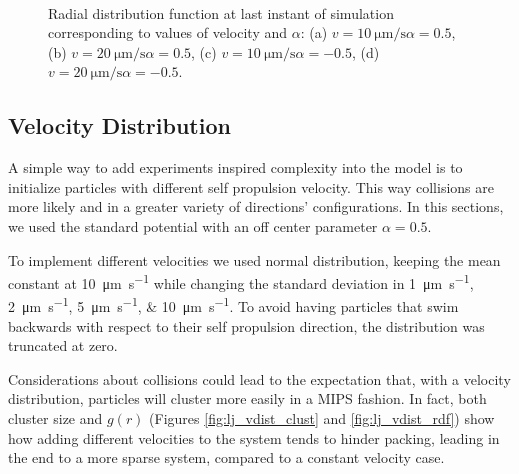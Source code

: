 \documentclass[../../master_thesis_np.tex]{subfiles}
\begin{document}
		\begin{figure}
			\centering
			\ContinuedFloat
			\\
			
			\caption{Radial distribution function at last instant of simulation corresponding to values of velocity and $\alpha$: (a) $v = \SI{10}{\um \per \second} \alpha = 0.5$, (b) $v = \SI{20}{\um \per \second} \alpha = 0.5$, (c) $v = \SI{10}{\um \per \second} \alpha = -0.5$, (d) $v = \SI{20}{\um \per \second} \alpha = -0.5$.}
			\label{fig:lj_velocity_rdf}
		\end{figure}

		\subsection{Velocity Distribution}
		\label{veldist}
		A simple way to add experiments inspired complexity into the model is to initialize particles with different self propulsion velocity. 
		This way collisions are more likely and in a greater variety of directions' configurations.
		In this sections, we used the standard potential with an off center parameter $\alpha = 0.5$.
		
		To implement different velocities we used normal distribution, keeping the mean constant at \SI{10}{\um \per \second} while changing the standard deviation in \qtylist{1; 2; 5; 10}{\um \per \second}.
		To avoid having particles that swim backwards with respect to their self propulsion direction, the distribution was truncated at zero.
		
		Considerations about collisions could lead to the expectation that, with a velocity distribution, particles will cluster more easily in a MIPS fashion.
		In fact, both cluster size and $g(r)$ (Figures \ref{fig:lj_vdist_clust} and \ref{fig:lj_vdist_rdf}) show how adding different velocities to the system tends to hinder packing, leading in the end to a more sparse system, compared to a constant velocity case.
		
\end{document}
